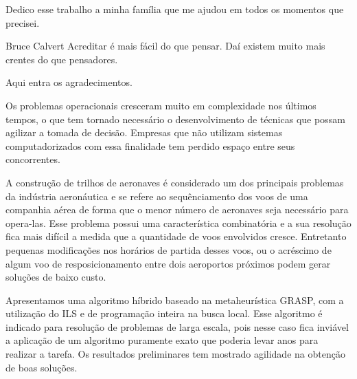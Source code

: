 \documentclass[oneside,normaltoc,espacoumemeio,PGTEXdissertacao]{pgeeltex}
\begin{document}


\folhaderostoPGTEX
\folhadeaprovacaoPGTEX

%
\begin{dedicatoriaPGTEX}
Dedico esse trabalho a minha família que me ajudou em todos os momentos
que precisei.
\end{dedicatoriaPGTEX}




\begin{epigrafePGTEX}{Bruce Calvert} 
Acreditar é mais fácil do que pensar. Daí existem muito mais crentes do que
pensadores.
\end{epigrafePGTEX}


\begin{agradecimentosPGTEX}
Aqui entra os agradecimentos.
\end{agradecimentosPGTEX}

\begin{resumoPGTEX}
Os problemas operacionais cresceram muito em complexidade nos últimos
tempos, o que tem tornado necessário o desenvolvimento de técnicas que possam agilizar a tomada de decisão. Empresas que não utilizam sistemas 
computadorizados com essa finalidade tem perdido espaço entre seus concorrentes.
 
 A construção de trilhos de aeronaves é considerado um dos principais problemas da indústria aeronáutica e se 
 refere ao sequênciamento dos voos de uma companhia aérea de forma que o menor número de aeronaves seja necessário 
 para opera-las. Esse problema possui uma característica combinatória e a sua resolução fica mais difícil a medida 
 que a quantidade de voos envolvidos cresce. Entretanto pequenas modificações nos horários de partida desses voos, 
 ou o acréscimo de algum voo de resposicionamento entre dois aeroportos próximos podem gerar soluções de baixo custo.
 
 Apresentamos uma algoritmo híbrido baseado na metaheurística GRASP, com a utilização do ILS e de programação inteira 
 na busca local. Esse algoritmo é indicado para resolução de problemas de larga escala, pois nesse caso fica inviável 
 a aplicação de um algoritmo puramente exato que poderia levar anos para realizar a tarefa. Os resultados preliminares 
 tem mostrado agilidade na obtenção de boas soluções.
 \end{resumoPGTEX}
\end{document}
